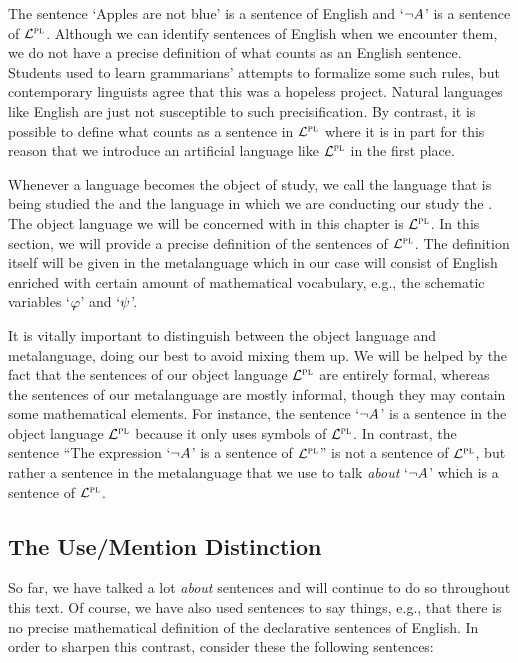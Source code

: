 The sentence `Apples are not blue' is a sentence of English and `$\neg A$' is a sentence of $\mathcal{L}^{\textsc{pl}}$.
Although we can identify sentences of English when we encounter them, we do not have a precise definition of what counts as an English sentence.
Students used to learn grammarians' attempts to formalize some such rules, but contemporary linguists agree that this was a hopeless project.
Natural languages like English are just not susceptible to such precisification.
By contrast, it is possible to define what counts as a sentence in $\mathcal{L}^{\textsc{pl}}$ where it is in part for this reason that we introduce an artificial language like $\mathcal{L}^{\textsc{pl}}$ in the first place.

Whenever a language becomes the object of study, we call the language that is being studied the  and the language in which we are conducting our study the . \label{def.metalanguage}
The object language we will be concerned with in this chapter is $\mathcal{L}^{\textsc{pl}}$.
In this section, we will provide a precise definition of the sentences of $\mathcal{L}^{\textsc{pl}}$. 
The definition itself will be given in the metalanguage which in our case will consist of English enriched with certain amount of mathematical vocabulary, e.g., the schematic variables `$\varphi$' and `$\psi$'.

It is vitally important to distinguish between the object language and metalanguage, doing our best to avoid mixing them up.
We will be helped by the fact that the sentences of our object language $\mathcal{L}^{\textsc{pl}}$ are entirely formal, whereas the sentences of our metalanguage are mostly informal, though they may contain some mathematical elements.
For instance, the sentence `$\neg A$' is a sentence in the object language $\mathcal{L}^{\textsc{pl}}$ because it only uses symbols of $\mathcal{L}^{\textsc{pl}}$. 
In contrast, the sentence ``The expression `$\neg A$' is a sentence of $\mathcal{L}^{\textsc{pl}}$'' is not a sentence of $\mathcal{L}^{\textsc{pl}}$, but rather a sentence in the metalanguage that we use to talk \emph{about} `$\neg A$' which is a sentence of $\mathcal{L}^{\textsc{pl}}$.






\subsection{The Use/Mention Distinction}
  \label{sub.use-mention}

So far, we have talked a lot \textit{about} sentences and will continue to do so throughout this text.
Of course, we have also used sentences to say things, e.g., that there is no precise mathematical definition of the declarative sentences of English.
In order to sharpen this contrast, consider these the following sentences:


